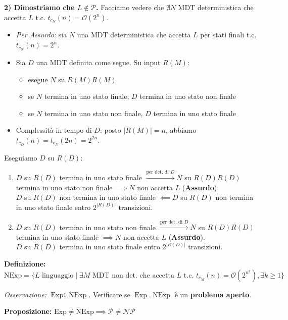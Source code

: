 \textbf{2) Dimostriamo che $L \notin \mathcal{P}$.} 
Facciamo vedere che $\nexists N$ MDT deterministica che accetta $L$ t.c. $t_{c_N}(n) = \mathcal{O}(2^n)$.
\begin{itemize}
    \item \textit{Per Assurdo:} sia $N$ una MDT deterministica che accetta $L$ per stati finali t.c. $t_{c_N}(n) = 2^n$.
    \item Sia $D$ una MDT definita come segue. Su input $R(M)$:
    \begin{itemize}
        \item esegue $N$ su $R(M)R(M)$
        \item se $N$ termina in uno stato finale, $D$ termina in uno stato non finale
        \item se $N$ termina in uno stato non finale, $D$ termina in uno stato finale
    \end{itemize}
    \item Complessità in tempo di $D$: posto $|R(M)| = n$, abbiamo $t_{c_D}(n) = t_{c_N}(2n) = 2^{2n}$.
\end{itemize}
Eseguiamo $D$ su $R(D)$:
\begin{enumerate}
    \item $D$ su $R(D)$ termina in uno stato finale $\xrightarrow{\text{per det. di } D} N$ su $R(D)R(D)$ termina in uno stato non finale $\implies N$ non accetta $L$ (\textbf{Assurdo}).\\
    $D$ su $R(D)$ non termina in uno stato finale $\impliedby D$ su $R(D)$ non termina in uno stato finale entro $2^{|R(D)|}$ transizioni.
    
    \item $D$ su $R(D)$ termina in uno stato non finale $\xrightarrow{\text{per det. di } D} N$ su $R(D)R(D)$ termina in uno stato finale $\implies N$ non accetta $L$ (\textbf{Assurdo}).\\
    $D$ su $R(D)$ termina in uno stato finale entro $2^{|R(D)|}$ transizioni.
\end{enumerate}

\vspace{0.6cm}
\textbf{Definizione:} 
$$ \text{NExp} = \{ L \text{ linguaggio} \mid \exists M \text{ MDT non det. che accetta } L \text{ t.c. } t_{c_M}(n) = \mathcal{O}(2^{n^k}), \exists k \ge 1 \} $$

\textit{Osservazione:} $\text{Exp} \subseteq \text{NExp}$. Verificare se $\text{Exp} = \text{NExp}$ è un \textbf{problema aperto}.

\vspace{0.4cm}
\textbf{Proposizione:} $\text{Exp} \neq \text{NExp} \implies \mathcal{P} \neq \mathcal{NP}$

